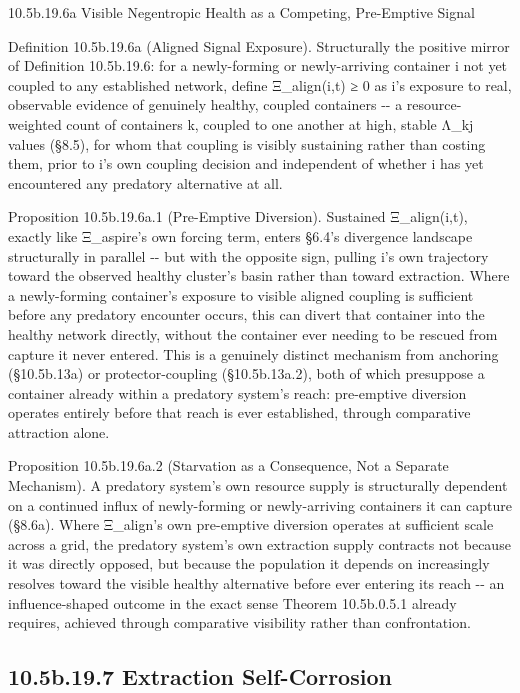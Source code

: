 \documentclass[
]{article}
\begin{document}
10.5b.19.6a Visible Negentropic Health as a Competing, Pre-Emptive
Signal

Definition 10.5b.19.6a (Aligned Signal Exposure). Structurally the
positive mirror of Definition 10.5b.19.6: for a newly-forming or
newly-arriving container i not yet coupled to any established network,
define Ξ\_align(i,t) ≥ 0 as i's exposure to real, observable evidence of
genuinely healthy, coupled containers -\/- a resource-weighted count of
containers k, coupled to one another at high, stable Λ\_kj values
(§8.5), for whom that coupling is visibly sustaining rather than costing
them, prior to i's own coupling decision and independent of whether i
has yet encountered any predatory alternative at all.

Proposition 10.5b.19.6a.1 (Pre-Emptive Diversion). Sustained
Ξ\_align(i,t), exactly like Ξ\_aspire's own forcing term, enters §6.4's
divergence landscape structurally in parallel -\/- but with the opposite
sign, pulling i's own trajectory toward the observed healthy cluster's
basin rather than toward extraction. Where a newly-forming container's
exposure to visible aligned coupling is sufficient before any predatory
encounter occurs, this can divert that container into the healthy
network directly, without the container ever needing to be rescued from
capture it never entered. This is a genuinely distinct mechanism from
anchoring (§10.5b.13a) or protector-coupling (§10.5b.13a.2), both of
which presuppose a container already within a predatory system's reach:
pre-emptive diversion operates entirely before that reach is ever
established, through comparative attraction alone.

Proposition 10.5b.19.6a.2 (Starvation as a Consequence, Not a Separate
Mechanism). A predatory system's own resource supply is structurally
dependent on a continued influx of newly-forming or newly-arriving
containers it can capture (§8.6a). Where Ξ\_align's own pre-emptive
diversion operates at sufficient scale across a grid, the predatory
system's own extraction supply contracts not because it was directly
opposed, but because the population it depends on increasingly resolves
toward the visible healthy alternative before ever entering its reach
-\/- an influence-shaped outcome in the exact sense Theorem 10.5b.0.5.1
already requires, achieved through comparative visibility rather than
confrontation.

\hypertarget{b.19.7-extraction-self-corrosion}{%
\subsection{10.5b.19.7 Extraction
Self-Corrosion}\label{b.19.7-extraction-self-corrosion}}
\end{document}
